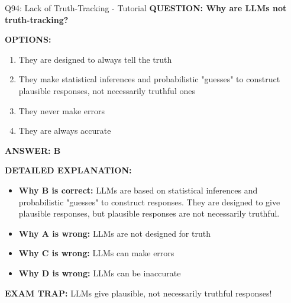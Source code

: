 \documentclass[8pt]{beamer}
\begin{document}
	\begin{frame}{Q94: Lack of Truth-Tracking - Tutorial}
		\fontsize{6.5}{7.5}\selectfont
		\textbf{QUESTION: Why are LLMs not truth-tracking?}
		
		\vspace{0.1cm}
		\textbf{OPTIONS:}
		\begin{enumerate}
			\item They are designed to always tell the truth
			\item They make statistical inferences and probabilistic "guesses" to construct plausible responses, not necessarily truthful ones
			\item They never make errors
			\item They are always accurate
		\end{enumerate}
		
		\vspace{0.1cm}
		\textcolor{myblue}{\textbf{ANSWER: B}}
		
		\vspace{0.1cm}
		\textbf{DETAILED EXPLANATION:}
		\begin{itemize}
			\item \textbf{Why B is correct:} LLMs are based on statistical inferences and probabilistic "guesses" to construct responses. They are designed to give plausible responses, but plausible responses are not necessarily truthful.
			\item \textbf{Why A is wrong:} LLMs are not designed for truth
			\item \textbf{Why C is wrong:} LLMs can make errors
			\item \textbf{Why D is wrong:} LLMs can be inaccurate
		\end{itemize}
		
		\textcolor{myred}{\textbf{EXAM TRAP:}} LLMs give \textcolor{myblue}{plausible, not necessarily truthful} responses!
	\end{frame}
	
\end{document}
